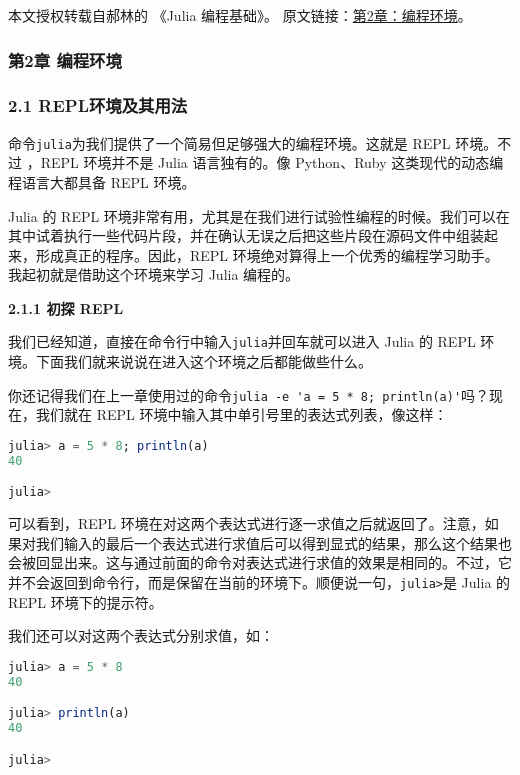 
本文授权转载自郝林的 《Julia 编程基础》。 原文链接：\href{https://github.com/hyper0x/JuliaBasics/blob/master/book/ch02.md}{第2章：编程环境}。


\subsubsection{第2章  编程环境}

\subsubsection{2.1 REPL环境及其用法}

命令\verb`julia`为我们提供了一个简易但足够强大的编程环境。这就是 REPL 环境。不过
，REPL 环境并不是 Julia 语言独有的。像 Python、Ruby 这类现代的动态编程语言大都具备 REPL 环境。

Julia 的 REPL 环境非常有用，尤其是在我们进行试验性编程的时候。我们可以在其中试着执行一些代码片段，并在确认无误之后把这些片段在源码文件中组装起来，形成真正的程序。因此，REPL 环境绝对算得上一个优秀的编程学习助手。我起初就是借助这个环境来学习 Julia 编程的。

\textbf{2.1.1 初探 REPL}

我们已经知道，直接在命令行中输入\verb`julia`并回车就可以进入 Julia 的 REPL 环境。下面我们就来说说在进入这个环境之后都能做些什么。

你还记得我们在上一章使用过的命令\verb`julia -e 'a = 5 * 8; println(a)'`吗？现在，我们就在 REPL 环境中输入其中单引号里的表达式列表，像这样：

\begin{lstlisting}[language=julia]
julia> a = 5 * 8; println(a)
40

julia>
\end{lstlisting}

可以看到，REPL 环境在对这两个表达式进行逐一求值之后就返回了。注意，如果对我们输入的最后一个表达式进行求值后可以得到显式的结果，那么这个结果也会被回显出来。这与通过前面的命令对表达式进行求值的效果是相同的。不过，它并不会返回到命令行，而是保留在当前的环境下。顺便说一句，\verb`julia>`是 Julia 的 REPL 环境下的提示符。

我们还可以对这两个表达式分别求值，如：

\begin{lstlisting}[language=julia]
julia> a = 5 * 8
40

julia> println(a)
40

julia> 
\end{lstlisting}


